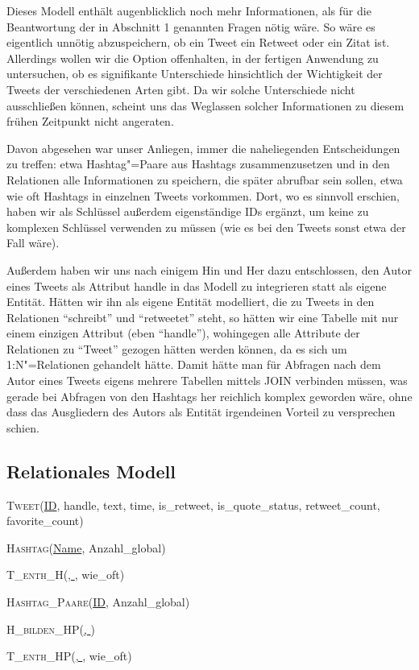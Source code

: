 \documentclass[BCOR0mm,fontsize=12pt,paper=a4,final,numbers=noenddot]{scrartcl}
\begin{document}
\noindent{}Dieses Modell enthält augenblicklich noch mehr Informationen, als für die Beantwortung der in Abschnitt 1 genannten Fragen nötig wäre. So wäre es eigentlich unnötig abzuspeichern, ob ein Tweet ein Retweet oder ein Zitat ist. Allerdings wollen wir die Option offenhalten, in der fertigen Anwendung zu untersuchen, ob es signifikante Unterschiede hinsichtlich der Wichtigkeit der Tweets der verschiedenen Arten gibt. Da wir solche Unterschiede nicht ausschließen können, scheint uns das Weglassen solcher Informationen zu diesem frühen Zeitpunkt nicht angeraten.

Davon abgesehen war unser Anliegen, immer die naheliegenden Entscheidungen zu treffen: etwa Hashtag"=Paare aus Hashtags zusammenzusetzen und in den Relationen alle Informationen zu speichern, die später abrufbar sein sollen, etwa wie oft Hashtags in einzelnen Tweets vorkommen. Dort, wo es sinnvoll erschien, haben wir als Schlüssel außerdem eigenständige IDs ergänzt, um keine zu komplexen Schlüssel verwenden zu müssen (wie es bei den Tweets sonst etwa der Fall wäre).

Außerdem haben wir uns nach einigem Hin und Her dazu entschlossen, den Autor eines Tweets als Attribut handle in das Modell zu integrieren statt als eigene Entität. Hätten wir ihn als eigene Entität modelliert, die zu Tweets in den Relationen "`schreibt"' und "`retweetet"' steht, so hätten wir eine Tabelle mit nur einem einzigen Attribut (eben "`handle"'), wohingegen alle Attribute der Relationen zu "`Tweet"' gezogen hätten werden können, da es sich um 1:N"=Relationen gehandelt hätte. Damit hätte man für Abfragen nach dem Autor eines Tweets eigens mehrere Tabellen mittels JOIN verbinden müssen, was gerade bei Abfragen von den Hashtags her reichlich komplex geworden wäre, ohne dass das Ausgliedern des Autors als Entität irgendeinen Vorteil zu versprechen schien.


\subsection{Relationales Modell}

\noindent\textsc{Tweet}(\uline{ID}, handle, text, time, is\_retweet, is\_quote\_status, retweet\_count, favorite\_count)

\noindent\textsc{Hashtag}(\uline{Name}, Anzahl\_global)

\noindent\textsc{T\_enth\_H}(\uline{, }, wie\_oft)

\noindent\textsc{Hashtag\_Paare}(\uline{ID}, Anzahl\_global)

\noindent\textsc{H\_bilden\_HP}(\uline{, })

\noindent\textsc{T\_enth\_HP}(\uline{, }, wie\_oft)
\end{document}
